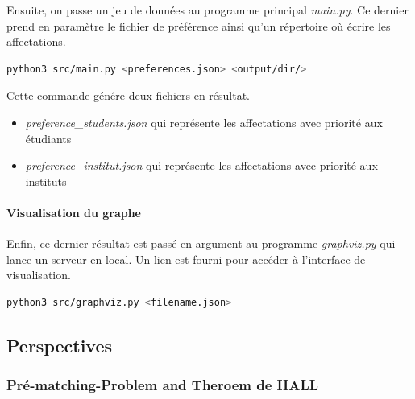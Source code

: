 \documentclass[12pt,titlepage]{article}
\begin{document}
Ensuite, on passe un jeu de données au programme principal \textit{main.py}. Ce dernier prend en paramètre le fichier de préférence ainsi qu'un répertoire où écrire les affectations.

\begin{lstlisting}[language=bash,caption="Commande qui exécute le programme principal"]  
  python3 src/main.py <preferences.json> <output/dir/>
\end{lstlisting}

Cette commande génére deux fichiers en résultat. 
\begin{itemize}
  \item \textit{preference\_students.json} qui représente les affectations avec priorité aux étudiants
  \item \textit{preference\_institut.json} qui représente les affectations avec priorité aux instituts
\end{itemize}

\paragraph{Visualisation du graphe}

Enfin, ce dernier résultat est passé en argument au programme \textit{graphviz.py} qui lance un serveur en local. Un lien est fourni pour accéder à l'interface de visualisation.

\begin{lstlisting}[language=bash,caption="Commande qui lance la visualisation" ]  
  python3 src/graphviz.py <filename.json>
\end{lstlisting}

\subsection{Perspectives}

\subsubsection{Pré-matching-Problem and Theroem de HALL}
\end{document}
